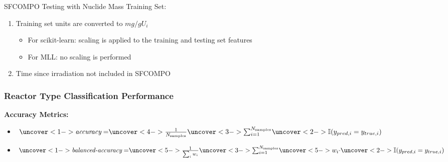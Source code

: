 \begin{frame}
\begin{adjustwidth}{-15pt}{0pt}
{\begin{block}{SFCOMPO Testing with Nuclide Mass Training Set:}
\begin{enumerate}
        \item Training set units are converted to $mg/gU_i$
        \begin{itemize}
          \footnotesize
          \item For scikit-learn: scaling is applied to the training and testing set features
          \item For MLL: no scaling is performed
        \end{itemize}
        \item Time since irradiation not included in SFCOMPO
      \end{enumerate}
    \end{block}
  }
  \end{adjustwidth}
\end{frame}

\begin{frame}
  \frametitle{Reactor Type Classification Performance}
  \textbf{Accuracy Metrics:} \cite{scikit}
  \vspace{2mm}
  \begin{itemize}\addtolength{\itemsep}{0.4\baselineskip}
    \item $\uncover<1->{\textit{accuracy} = }
           \uncover<4->{\frac{1}{N_\text{samples}}}
           \uncover<3->{\sum_{i=1}^{N_\text{samples}}}
           \uncover<2->{\mathbb{I}(y_{pred,i} = y_{true,i})}$
    \item $\uncover<1->{\textit{balanced-accuracy} = }
           \uncover<5->{\frac{1}{\sum_{i}{w_i}}}
           \uncover<3->{\sum_{i=1}^{N_\text{samples}}}
           \uncover<5->{w_i \cdot}
           \uncover<2->{\mathbb{I}(y_{pred, i} = y_{true, i})}$ \\
          \hspace{1.1cm}  
  \end{itemize}
\end{frame}
